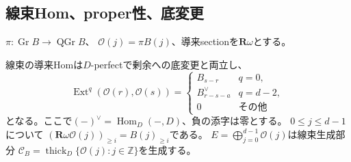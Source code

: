 \subsection{線束Hom、proper性、底変更}

$\pi:\operatorname{Gr}B\to\operatorname{QGr}B$、
$\mathcal O(j)=\pi B(j)$、導来sectionを$\mathbf R\omega$とする。

\begin{lemma}[線束の有限window]\label{fdw:lem:lines}
線束の導来Homは$D$-perfectで剰余への底変更と両立し、
\[
 \operatorname{Ext}^q(\mathcal O(r),\mathcal O(s))=
 \begin{cases}B_{s-r}&q=0,\\B_{r-s-a}^{\vee}&q=d-2,\\0&\text{その他}\end{cases}
\]
となる。ここで$(-)^\vee=\operatorname{Hom}_D(-,D)$、負の添字は零とする。
$0\le j\le d-1$について
$(\mathbf R\omega\mathcal O(j))_{\ge i}=B(j)_{\ge i}$である。
$E=\bigoplus_{j=0}^{d-1}\mathcal O(j)$は線束生成部分
$\mathcal C_B=\operatorname{thick}_D\{\mathcal O(j):j\in\mathbb Z\}$を生成する。
\end{lemma}
